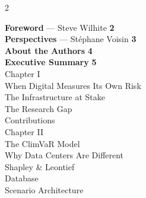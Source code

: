 
\begin{multicols}{2}

{\fontsize{9}{12}\selectfont

\noindent\textbf{\color{SEDarkGreen}Foreword} --- Steve Wilhite \dotfill \textbf{2}\\[2pt]
\noindent\textbf{\color{SEDarkGreen}Perspectives} --- St\'{e}phane Voisin \dotfill \textbf{3}\\[2pt]
\noindent\textbf{\color{SEDarkGreen}About the Authors} \dotfill \textbf{4}\\[2pt]
\noindent\textbf{\color{SEDarkGreen}Executive Summary} \dotfill \textbf{5}\\[14pt]
%
{\fontsize{12}{15}\selectfont\displayfont\color{SEGreen}Chapter I}\\[3pt]
\noindent\hspace{5mm}When Digital Measures Its Own Risk \dotfill \pageref{toc:digital}\\[1pt]
\noindent\hspace{5mm}The Infrastructure at Stake \dotfill \pageref{toc:infra}\\[1pt]
\noindent\hspace{5mm}The Research Gap \dotfill \pageref{toc:gap}\\[1pt]
\noindent\hspace{5mm}Contributions \dotfill \pageref{toc:contrib}\\[14pt]
%
{\fontsize{12}{15}\selectfont\displayfont\color{SEGreen}Chapter II}\\[3pt]
\noindent\hspace{5mm}The ClimVaR Model \dotfill \pageref{toc:model}\\[1pt]
\noindent\hspace{5mm}Why Data Centers Are Different \dotfill \pageref{toc:different}\\[1pt]
\noindent\hspace{5mm}Shapley \& Leontief \dotfill \pageref{toc:shapley}\\[1pt]
\noindent\hspace{5mm}Database \dotfill \pageref{toc:database}\\[1pt]
\noindent\hspace{5mm}Scenario Architecture \dotfill \pageref{toc:scenarios}\\[14pt]

}
\end{multicols}
